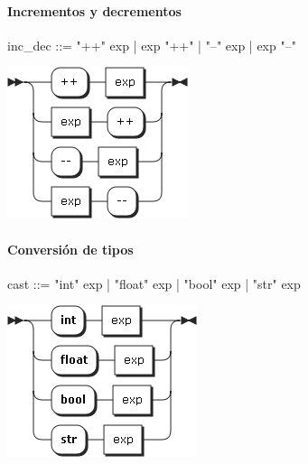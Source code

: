 \paragraph{Incrementos y decrementos}
\begin{multicols}{2}
\begin{myverbatim}      
inc_dec ::= "++" exp
         |  exp "++"
         |  "--" exp
         |  exp "--"
\end{myverbatim}  
\columnbreak	
\begin{center}
\includegraphics[scale=0.5]{diagram/inc_dec.png} \\
\end{center}
\end{multicols}
\pagebreak
\paragraph{Conversión de tipos}
\begin{multicols}{2}
\begin{myverbatim}      
cast ::= "int" exp
      |  "float" exp
      |  "bool" exp
      |  "str" exp
\end{myverbatim}  
\columnbreak	
\begin{center}
\includegraphics[scale=0.5]{diagram/cast.png} \\
\end{center}
\end{multicols}




